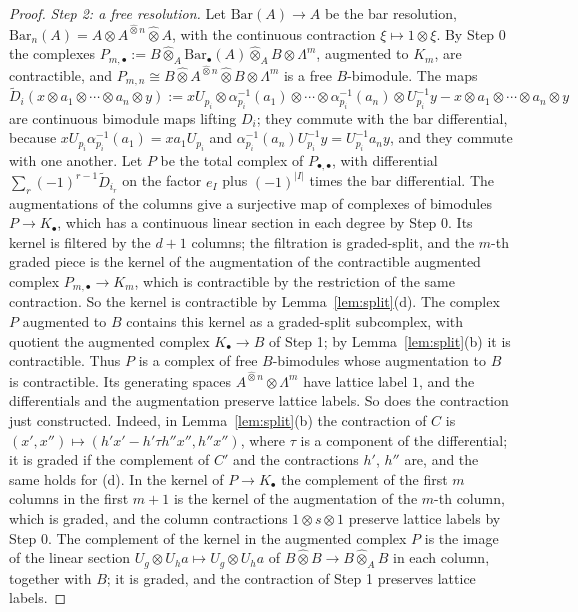 \documentclass[11pt]{amsart}
\theoremstyle{definition}
\theoremstyle{remark}
\begin{document}
\begin{proof}
\emph{Step 2: a free resolution.}  Let $\mathrm{Bar}(A)\to A$ be the bar
resolution, $\mathrm{Bar}_n(A)=A\widehat\otimes A^{\widehat\otimes
n}\widehat\otimes A$, with the continuous contraction
$\xi\mapsto1\otimes\xi$.  By Step 0 the complexes
$P_{m,\bullet}:=B\widehat\otimes_A\mathrm{Bar}_{\bullet}(A)\widehat\otimes_A
B\otimes\Lambda^{m}$, augmented to $K_m$, are contractible, and
$P_{m,n}\cong B\widehat\otimes A^{\widehat\otimes n}\widehat\otimes
B\otimes\Lambda^{m}$ is a free $B$-bimodule.  The maps
\[
\widetilde D_i(x\otimes a_1\otimes\cdots\otimes a_n\otimes y):=
xU_{p_i}\otimes\alpha_{p_i}^{-1}(a_1)\otimes\cdots\otimes
\alpha_{p_i}^{-1}(a_n)\otimes U_{p_i}^{-1}y-x\otimes a_1\otimes\cdots\otimes
a_n\otimes y
\]
are continuous bimodule maps lifting $D_i$; they commute with the bar
differential, because $xU_{p_i}\alpha_{p_i}^{-1}(a_1)=xa_1U_{p_i}$ and
$\alpha_{p_i}^{-1}(a_n)U_{p_i}^{-1}y=U_{p_i}^{-1}a_ny$, and they commute with
one another.  Let $P$ be the total complex of $P_{\bullet,\bullet}$, with
differential $\sum_r(-1)^{r-1}\widetilde D_{i_r}$ on the factor $e_I$ plus
$(-1)^{|I|}$ times the bar differential.  The augmentations of the columns
give a surjective map of complexes of bimodules $P\to K_{\bullet}$, which has
a continuous linear section in each degree by Step 0.  Its kernel is filtered
by the $d+1$ columns; the filtration is graded-split, and the $m$-th graded
piece is the kernel of the augmentation of the contractible augmented complex
$P_{m,\bullet}\to K_m$, which is contractible by the restriction of the same
contraction.  So the kernel is contractible by Lemma~\ref{lem:split}(d).  The
complex $P$ augmented to $B$ contains this kernel as a graded-split
subcomplex, with quotient the augmented complex $K_{\bullet}\to B$ of Step 1;
by Lemma~\ref{lem:split}(b) it is contractible.  Thus $P$ is a complex of
free $B$-bimodules whose augmentation to $B$ is contractible.  Its generating
spaces $A^{\widehat\otimes n}\otimes\Lambda^{m}$ have lattice label $1$, and
the differentials and the augmentation preserve lattice labels.
So does the contraction just constructed.  Indeed, in
Lemma~\ref{lem:split}(b) the contraction of $C$ is
$(x',x'')\mapsto(h'x'-h'\tau h''x'',h''x'')$, where $\tau$ is a component of the
differential; it is graded if the complement of $C'$ and the contractions
$h'$, $h''$ are, and the same holds for (d).  In the kernel of
$P\to K_{\bullet}$ the complement of the first $m$ columns in the first $m+1$
is the kernel of the augmentation of the $m$-th column, which is graded, and
the column contractions $1\otimes s\otimes1$ preserve lattice labels by
Step 0.  The complement of the kernel in the augmented complex $P$ is the
image of the linear section $U_g\otimes U_ha\mapsto U_g\otimes U_ha$ of
$B\widehat\otimes B\to B\widehat\otimes_AB$ in each column, together with $B$;
it is graded, and the contraction of Step 1 preserves lattice labels.


\end{proof}
\end{document}
